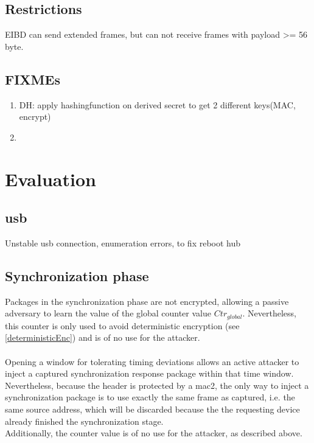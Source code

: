 \subsection{Restrictions }

EIBD can send extended frames, but can not receive frames with payload >= 56 byte. 

\subsection{FIXMEs}

\begin{enumerate}
 \item DH: apply hashingfunction on derived secret to get 2 different keys(MAC, encrypt)
 \item 
\end{enumerate}



\section{Evaluation}

\subsection{\gls{usb}}
Unstable \gls{usb} connection, enumeration errors, to fix reboot hub

\subsection{Synchronization phase}
Packages in the synchronization phase are not encrypted, allowing a passive adversary to learn the value of the global counter value $Ctr_{global}$. Nevertheless,
this counter is only used to avoid deterministic encryption (see \ref{deterministicEnc}) and is of no use for the attacker.
\\
\\
Opening a window for tolerating timing deviations allows an active attacker to inject a captured synchronization response package within that time window.
Nevertheless, because the header is protected by a \gls{mac2}, the only way to inject a synchronization package is to use exactly the same frame as captured,
i.e. the same source address, which will be discarded because the the requesting device already finished the synchronization stage.
\\
Additionally, the counter value is of no use for the attacker, as described above.

